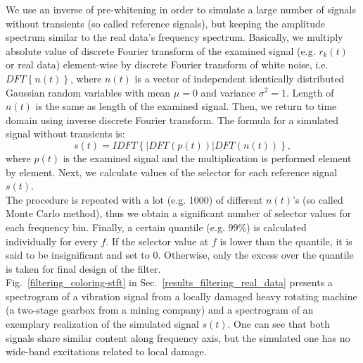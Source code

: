 We use an inverse of pre-whitening in order to simulate a large number of signals without transients (so called reference signals), but keeping the amplitude spectrum similar to the real data's frequency spectrum. Basically, we multiply absolute value of discrete Fourier transform of the examined signal (e.g. $r_k(t)$ or real data) element-wise by discrete Fourier transform of white noise, i.e. $DFT\left\{n(t)\right\}$, where $n(t)$ is a vector of independent identically distributed Gaussian random variables with mean $\mu=0$ and variance $\sigma^2=1$. Length of $n(t)$ is the same as length of the examined signal. Then, we return to time domain using inverse discrete Fourier transform. The formula for a simulated signal without transients is:
\begin{equation}
s(t)=IDFT\left\{{\left|DFT\left(p(t)\right)\right|}{DFT\left(n(t)\right)}\right\},
\end{equation}
where $p(t)$ is the examined signal and the multiplication is performed element by element. Next, we calculate values of the selector for each reference signal $s(t)$.\\
The procedure is repeated with a lot (e.g. 1000) of different $n(t)$'s (so called Monte Carlo method), thus we obtain a significant number of selector values for each frequency bin. Finally, a certain quantile (e.g. $99\%$) is calculated individually for every $f$. If the selector value at $f$ is lower than the quantile, it is said to be insignificant and set to 0. Otherwise, only the excess over the quantile is taken for final design of the filter.\\
Fig.~\ref{filtering_coloring-stft} in Sec.~\ref{results_filtering_real_data} presents a spectrogram of a vibration signal from a locally damaged heavy rotating machine (a two-stage gearbox from a mining company) and a spectrogram of an exemplary realization of the simulated signal $s(t)$. One can see that both signals share similar content along frequency axis, but the simulated one has no wide-band excitations related to local damage.
